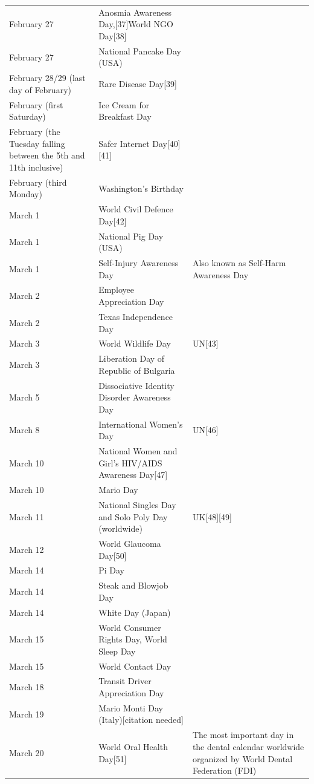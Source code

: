 \documentclass[
]{book}
\begin{document}
\begin{longtable}[t]{>{\raggedright\arraybackslash}p{8em}>{\raggedright\arraybackslash}p{20em}>{\raggedright\arraybackslash}p{12em}}
\addlinespace
February 27 & Anosmia Awareness Day,[37]World NGO Day[38] & \\
February 27 & National Pancake Day (USA) & \\
February 28/29 (last day of February) & Rare Disease Day[39] & \\
February (first Saturday) & Ice Cream for Breakfast Day & \\
February (the Tuesday falling between the 5th and 11th inclusive) & Safer Internet Day[40][41] & \\
\addlinespace
February (third Monday) & Washington's Birthday & \\
March 1 & World Civil Defence Day[42] & \\
March 1 & National Pig Day (USA) & \\
March 1 & Self-Injury Awareness Day & Also known as Self-Harm Awareness Day\\
March 2 & Employee Appreciation Day & \\
\addlinespace
March 2 & Texas Independence Day & \\
March 3 & World Wildlife Day & UN[43]\\
March 3 & Liberation Day of Republic of Bulgaria & [44]\\
March 5 & Dissociative Identity Disorder Awareness Day & [45]\\
March 8 & International Women's Day & UN[46]\\
\addlinespace
March 10 & National Women and Girl's HIV/AIDS Awareness Day[47] & \\
March 10 & Mario Day & \\
March 11 & National Singles Day and Solo Poly Day (worldwide) & UK[48][49]\\
March 12 & World Glaucoma Day[50] & \\
March 14 & Pi Day & \\
\addlinespace
March 14 & Steak and Blowjob Day & \\
March 14 & White Day (Japan) & \\
March 15 & World Consumer Rights Day, World Sleep Day & \\
March 15 & World Contact Day & \\
March 18 & Transit Driver Appreciation Day & \\
\addlinespace
March 19 & Mario Monti Day (Italy)[citation needed] & \\
March 20 & World Oral Health Day[51] & The most important day in the dental calendar worldwide organized by World Dental Federation (FDI)\\

\end{longtable}
\end{document}
